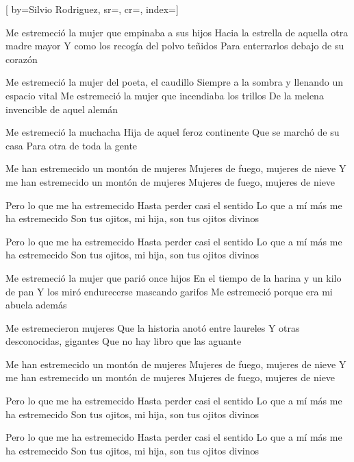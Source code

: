 [
        by={Silvio Rodriguez},
        sr={},
        cr={},
        index={}]

\beginverse
Me estremeció la mujer que empinaba a sus hijos
Hacia la estrella de aquella otra madre mayor
Y como los recogía del polvo teñidos
Para enterrarlos debajo de su corazón
\endverse

\beginverse
Me estremeció la mujer del poeta, el caudillo
Siempre a la sombra y llenando un espacio vital
Me estremeció la mujer que incendiaba los trillos
De la melena invencible de aquel alemán
\endverse

\beginverse
Me estremeció la muchacha
Hija de aquel feroz continente
Que se marchó de su casa
Para otra de toda la gente
\endverse

\beginverse
Me han estremecido un montón de mujeres
Mujeres de fuego, mujeres de nieve
Y me han estremecido un montón de mujeres
Mujeres de fuego, mujeres de nieve
\endverse

\beginverse
Pero lo que me ha estremecido
Hasta perder casi el sentido
Lo que a mí más me ha estremecido
Son tus ojitos, mi hija, son tus ojitos divinos
\endverse

\beginverse
Pero lo que me ha estremecido
Hasta perder casi el sentido
Lo que a mí más me ha estremecido
Son tus ojitos, mi hija, son tus ojitos divinos
 \endverse

\beginverse
Me estremeció la mujer que parió once hijos
En el tiempo de la harina y un kilo de pan
Y los miró endurecerse mascando garifos
Me estremeció porque era mi abuela además
\endverse

\beginverse
Me estremecieron mujeres
Que la historia anotó entre laureles
Y otras desconocidas, gigantes
Que no hay libro que las aguante
\endverse

\beginverse
Me han estremecido un montón de mujeres
Mujeres de fuego, mujeres de nieve
Y me han estremecido un montón de mujeres
Mujeres de fuego, mujeres de nieve
\endverse

\beginverse
Pero lo que me ha estremecido
Hasta perder casi el sentido
Lo que a mí más me ha estremecido
Son tus ojitos, mi hija, son tus ojitos divinos
\endverse

\beginverse
Pero lo que me ha estremecido
Hasta perder casi el sentido
Lo que a mí más me ha estremecido
Son tus ojitos, mi hija, son tus ojitos divinos
\endverse

\endsong